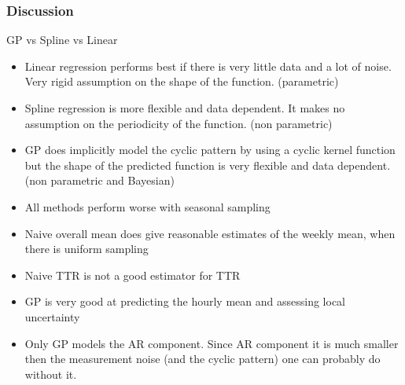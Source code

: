\documentclass[
	8pt, %
]{beamer}
\begin{document}
\begin{frame}

	\frametitle{Discussion}


	GP vs Spline vs Linear
	\begin{itemize}
		\item Linear regression performs best if there is very little data
		and a lot of noise.
		Very rigid assumption on the shape of the function.
		(parametric)

		\item Spline regression is more flexible and data dependent.
		It makes no assumption on the periodicity of the function.
		(non parametric)

		\item GP does implicitly model the cyclic pattern by using a cyclic
		kernel function but the shape of the predicted function is very flexible and
		data dependent.
		(non parametric and Bayesian)
	\end{itemize}

	\bigskip

	\begin{itemize}
		\item All methods perform worse with seasonal sampling
		\item Naive overall mean does give reasonable estimates of the weekly
		mean, when there is uniform sampling
		\item Naive TTR is not a good estimator for TTR
		\item GP is very good at predicting the hourly mean and assessing
		local uncertainty
		\item Only GP models the AR component.
		Since AR component it is much smaller
		then the measurement noise (and the cyclic pattern) one can probably
		do without it.
	\end{itemize}




\end{frame}
\end{document}
